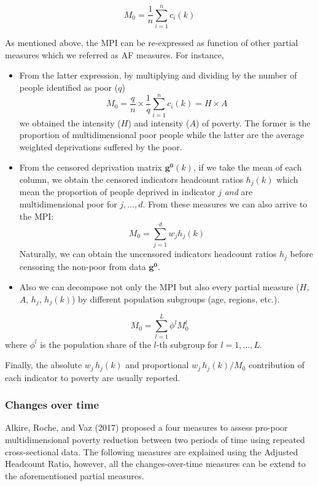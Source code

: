 \begin{enumerate}
  \[M_0 = \frac{1}{n} \sum_{i=1}^n c_i(k)\]

  As mentioned above, the MPI can be re-expressed as function of other
  partial measures which we referred as AF measures. For instance,
\end{enumerate}

\begin{itemize}
\item
  From the latter expression, by multiplying and dividing by the
  number of people identified as poor (\(q\))
  \[M_0 = \frac{q}{n} \times \frac{1}{q}\sum_{i=1}^n c_i(k) = H \times A \]
  we obtained the intensity (\(H\)) and intensity (\(A\)) of poverty. The
  former is the proportion of multidimensional poor people while the
  latter are the average weighted deprivations suffered by the poor.
\item
  From the censored deprivation matrix \(\mathbf{g^0}(k)\), if we take
  the mean of each column, we obtain the censored indicators headcount
  ratios \(h_j(k)\) which mean the proportion of people deprived in
  indicator \(j\) \emph{and} are multidimensional poor for \(j,\ldots,d\).
  From these measures we can also arrive to the MPI:
  \[M_0 = \sum_{j=1}^{d} w_j h_j(k)  \] Naturally, we can obtain the
  uncensored indicators headcount ratios \(h_j\) before censoring the
  non-poor from data \(\mathbf{g^0}\).
\item
  Also we can decompose not only the MPI but also every partial
  measure (\(H\), \(A\), \(h_j\), \(h_j(k)\)) by different population
  subgroups (age, regions, etc.).
\end{itemize}

\[ M_0 = \sum_{l=1}^L \phi^l M_0^l\] where \(\phi^l\) is the population
share of the \(l\)-th subgroup for \(l =1, \ldots, L\).

Finally, the absolute \(w_j \, h_j(k)\) and proportional
\(w_j \, h_j(k)/M_0\) contribution of each indicator to poverty are
usually reported.

\hypertarget{changes-over-time}{%
\subsubsection{Changes over time}\label{changes-over-time}}

Alkire, Roche, and Vaz (2017) proposed a four measures to assess pro-poor multidimensional
poverty reduction between two periods of time using repeated
cross-sectional data. The following measures are explained using the
Adjusted Headcount Ratio, however, all the changes-over-time measures
can be extend to the aforementioned partial measures.

